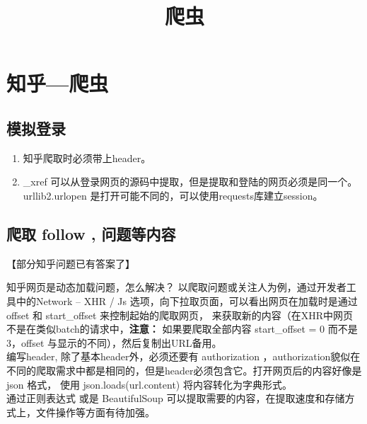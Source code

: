 \documentclass{article}
\title{爬虫}
\begin{document}
   \maketitle
   \section*{\Large 知乎---爬虫}
   \subsection{模拟登录} 
  \begin{enumerate}
    \item 知乎爬取时必须带上header。
    \item \_xref 可以从登录网页的源码中提取，但是提取和登陆的网页必须是同一个。urllib2.urlopen 是打开可能不同的，可以使用requests库建立session。
  \end{enumerate}

    \subsection{爬取 follow , 问题等内容}
    【部分知乎问题已有答案了】

    知乎网页是动态加载问题，怎么解决？
    以爬取问题或关注人为例，通过开发者工具中的Network -- XHR / Js 选项，向下拉取页面，可以看出网页在加载时是通过  offset 和  start\_offset 来控制起始的爬取网页，
     来获取新的内容（在XHR中网页不是在类似batch的请求中，\textbf{注意：} 如果要爬取全部内容  start\_offset = 0 而不是  3，offset  与显示的不同），然后复制出URL备用。
\\

    编写header, 除了基本header外，必须还要有 authorization ，authorization貌似在不同的爬取需求中都是相同的，但是header必须包含它。打开网页后的内容好像是 json 格式， 使用 json.loads(url.content) 将内容转化为字典形式。
\\

    通过正则表达式 或是 BeautifulSoup 可以提取需要的内容，在提取速度和存储方式上，文件操作等方面有待加强。
      
    
\end{document}
